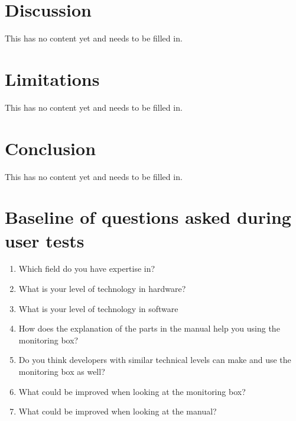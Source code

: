 \documentclass[conference]{IEEEtran}
\begin{document}
\section{Discussion}
This has no content yet and needs to be filled in. 

\section{Limitations}
This has no content yet and needs to be filled in. 

\section{Conclusion}
This has no content yet and needs to be filled in. 



\appendices
\section{Baseline of questions asked during user tests}
\begin{enumerate}
\item Which field do you have expertise in?
\item What is your level of technology in hardware?
\item What is your level of technology in software
\item How does the explanation of the parts in the manual help you using the monitoring box?
\item Do you think developers with similar technical levels can make and use the monitoring box as well?\item What could be improved when looking at the monitoring box?
\item What could be improved when looking at the manual?
\end{enumerate}
\end{document}
